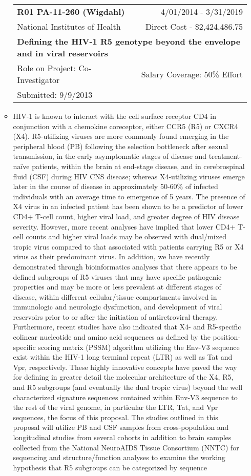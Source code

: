 \documentclass[a4paper,11pt]{article}
\makeatletter
\newenvironment{fullwidth}
    {\par
     \setlength{\@totalleftmargin}{0pt}%
     \setlength{\linewidth}{\hsize}%
     \list{}{\setlength{\leftmargin}{0pt}}
     \item\relax}
    {\endlist}
\makeatother
\begin{document}
\begin{enumerate}
\begin{itemize}
    \begin{longtable}{lr}
    \textbf{R01 PA-11-260 (Wigdahl)} & 4/01/2014 - 3/31/2019 \\
    National Institutes of Health & Direct Cost - \$2,424,486.75 \\
    \multicolumn{2}{p{0.973\textwidth}}{\bfseries Defining the HIV-1 R5 genotype beyond the envelope and in viral reservoirs} \\
    Role on Project:  Co-Investigator & Salary Coverage: 50\% Effort \\
    Submitted: 9/9/2013\\
    \end{longtable}
    \begin{fullwidth}
     HIV-1 is known to interact with the cell surface receptor CD4 in conjunction with a chemokine coreceptor, either CCR5 (R5) or CXCR4 (X4). R5-utilizing viruses are more commonly found emerging in the peripheral blood (PB) following the selection bottleneck after sexual transmission, in the early asymptomatic stages of disease and treatment-naïve patients, within the brain at end-stage disease, and in cerebrospinal fluid (CSF) during HIV CNS disease; whereas X4-utilizing viruses emerge later in the course of disease in approximately 50-60\% of infected individuals with an average time to emergence of 5 years. The presence of X4 virus in an infected patient has been shown to be a predictor of lower CD4+ T-cell count, higher viral load, and greater degree of HIV disease severity. However, more recent analyses have implied that lower CD4+ T-cell counts and higher viral loads may be observed with dual/mixed tropic virus compared to that associated with patients carrying R5 or X4 virus as their predominant virus. In addition, we have recently demonstrated through bioinformatics analyses that there appears to be defined subgroups of R5 viruses that may have specific pathogenic properties and may be more or less prevalent at different stages of disease, within different cellular/tissue compartments involved in immunologic and neurologic dysfunction, and development of viral reservoirs prior to or after the initiation of antiretroviral therapy.  Furthermore, recent studies have also indicated that X4- and R5-specific colinear nucleotide and amino acid sequences as defined by the position-specific scoring matrix (PSSM) algorithm utilizing the Env-V3 sequence exist within the HIV-1 long terminal repeat (LTR) as well as Tat and Vpr, respectively. These highly innovative concepts have paved the way for defining in greater detail the molecular architecture of the X4, R5, and R5 subgroups (and eventually the dual tropic virus) beyond the well characterized signature sequences contained within Env-V3 sequence to the rest of the viral genome, in particular the LTR, Tat, and Vpr sequences, the focus of this proposal. The studies outlined in this proposal will utilize PB and CSF samples from cross-population and longitudinal studies from several cohorts in addition to brain samples collected from the National NeuroAIDS Tissue Consortium (NNTC) for sequencing and structure/function analyses to examine the working hypothesis that R5 subgroups can be categorized by sequence 
\end{fullwidth}
\end{itemize}
\end{enumerate}
\end{document}
